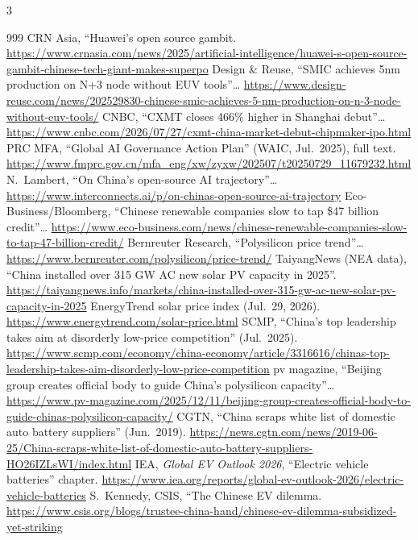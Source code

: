 \begin{multicols}{3}
\begin{thebibliography}{999}
 CRN Asia, ``Huawei's open source gambit. \url{https://www.crnasia.com/news/2025/artificial-intelligence/huawei-s-open-source-gambit-chinese-tech-giant-makes-superpo}
 Design \& Reuse, ``SMIC achieves 5nm production on N+3 node without EUV tools''… \url{https://www.design-reuse.com/news/202529830-chinese-smic-achieves-5-nm-production-on-n-3-node-without-euv-tools/}
 CNBC, ``CXMT closes 466\% higher in Shanghai debut''… \url{https://www.cnbc.com/2026/07/27/cxmt-china-market-debut-chipmaker-ipo.html}
 PRC MFA, ``Global AI Governance Action Plan'' (WAIC, Jul.\ 2025), full text. \url{https://www.fmprc.gov.cn/mfa_eng/xw/zyxw/202507/t20250729_11679232.html}
 N.~Lambert, ``On China's open-source AI trajectory''… \url{https://www.interconnects.ai/p/on-chinas-open-source-ai-trajectory}
 Eco-Business/Bloomberg, ``Chinese renewable companies slow to tap \$47 billion credit''… \url{https://www.eco-business.com/news/chinese-renewable-companies-slow-to-tap-47-billion-credit/}
 Bernreuter Research, ``Polysilicon price trend''… \url{https://www.bernreuter.com/polysilicon/price-trend/}
 TaiyangNews (NEA data), ``China installed over 315 GW AC new solar PV capacity in 2025''. \url{https://taiyangnews.info/markets/china-installed-over-315-gw-ac-new-solar-pv-capacity-in-2025}
 EnergyTrend solar price index (Jul.\ 29, 2026). \url{https://www.energytrend.com/solar-price.html}
 SCMP, ``China's top leadership takes aim at disorderly low-price competition'' (Jul.\ 2025). \url{https://www.scmp.com/economy/china-economy/article/3316616/chinas-top-leadership-takes-aim-disorderly-low-price-competition}
 pv magazine, ``Beijing group creates official body to guide China's polysilicon capacity''… \url{https://www.pv-magazine.com/2025/12/11/beijing-group-creates-official-body-to-guide-chinas-polysilicon-capacity/}
 CGTN, ``China scraps white list of domestic auto battery suppliers'' (Jun.\ 2019). \url{https://news.cgtn.com/news/2019-06-25/China-scraps-white-list-of-domestic-auto-battery-suppliers-HO26IZLsWI/index.html}
 IEA, \emph{Global EV Outlook 2026}, ``Electric vehicle batteries'' chapter. \url{https://www.iea.org/reports/global-ev-outlook-2026/electric-vehicle-batteries}
 S.~Kennedy, CSIS, ``The Chinese EV dilemma. \url{https://www.csis.org/blogs/trustee-china-hand/chinese-ev-dilemma-subsidized-yet-striking}

\end{thebibliography}
\end{multicols}
